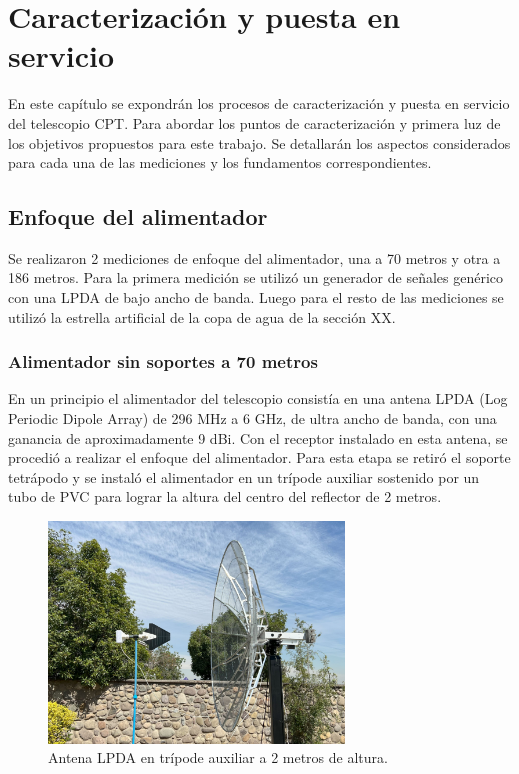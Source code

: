 \chapter{Caracterización y puesta en servicio}

En este capítulo se expondrán los procesos de caracterización y puesta en servicio del telescopio CPT. Para abordar los puntos de caracterización y primera luz de los objetivos propuestos para este trabajo. Se detallarán los aspectos considerados para cada una de las mediciones y los fundamentos correspondientes.

\section{Enfoque del alimentador}

Se realizaron 2 mediciones de enfoque del alimentador, una a 70 metros y otra a 186 metros. Para la primera medición se utilizó un generador de señales genérico con una LPDA de bajo ancho de banda. Luego para el resto de las mediciones se utilizó la estrella artificial de la copa de agua de la sección XX.\\

\subsection{Alimentador sin soportes a 70 metros}

En un principio el alimentador del telescopio consistía en una antena LPDA (Log Periodic Dipole Array) de 296 MHz a 6 GHz, de ultra ancho de banda, con una ganancia de aproximadamente 9 dBi. Con el receptor instalado en esta antena, se procedió a realizar el enfoque del alimentador. Para esta etapa se retiró el soporte tetrápodo y se instaló el alimentador en un trípode auxiliar sostenido por un tubo de PVC para lograr la altura del centro del reflector de 2 metros.\\

\begin{figure}
    \centering
    \includegraphics[width=0.7\textwidth]{img/enfoque1}
    \caption{Antena LPDA en trípode auxiliar a 2 metros de altura.}
    \label{fig:antena_lpda}
\end{figure}

